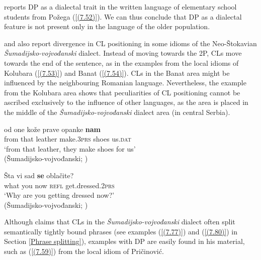 \citet[165]{Aladrovic11} reports DP as a dialectal trait in the written language of elementary school students from Požega (\ref{(7.52)}). We can thus conclude that DP as a dialectal feature is not present only in the language of the older population. 


\noindent \citet[279]{Nikolic66} and \citet[136]{Okuka08} also report divergence in CL positioning in some idioms of the Neo-Štokavian \textit{Šumadijsko-vojvođanski} dialect. Instead of moving towards the 2P, CLs move towards the end of the sentence, as in the examples from the local idioms of Kolubara (\ref{(7.53)}) and Banat (\ref{(7.54)}). CLs in the Banat area might be influenced by the neighbouring Romanian language. Nevertheless, the example from the Kolubara area shows that peculiarities of CL positioning cannot be ascribed exclusively to the influence of other languages, as the area is placed in the middle of the \textit{Šumadijsko-vojvođanski} dialect area (in central Serbia).

\begin{exe}\ex\label{(7.53)}
\gll od  one  kože prave opanke \textbf{nam}  \\
from that leather make.\textsc{3prs}  shoes us.\textsc{dat}  \\
\glt  ‘from that leather, they make shoes for us’ \\
\hfill  (Šumadijsko-vojvođanski; \citealt[136]{Okuka08})

\ex\label{(7.54)}
\gll Šta vi sad \textbf{se} oblačite? \\
what you  now \textsc{refl}  get.dressed.2\textsc{prs}  \\
\glt ‘Why are you getting dressed now?’ \\
\hfill (Šumadijsko-vojvođanski; \citealt[136]{Okuka08})
\end{exe}

\noindent Although \citet[279]{Nikolic66} claims that CLs in the \textit{Šumadijsko-vojvođanski} dialect often split semantically tightly bound phrases (see examples (\ref{(7.77)}) and (\ref{(7.80)}) in Section \ref{Phrase splitting}), examples with DP are easily found in his material, such as (\ref{(7.59)}) from the local idiom of Pričinović.

